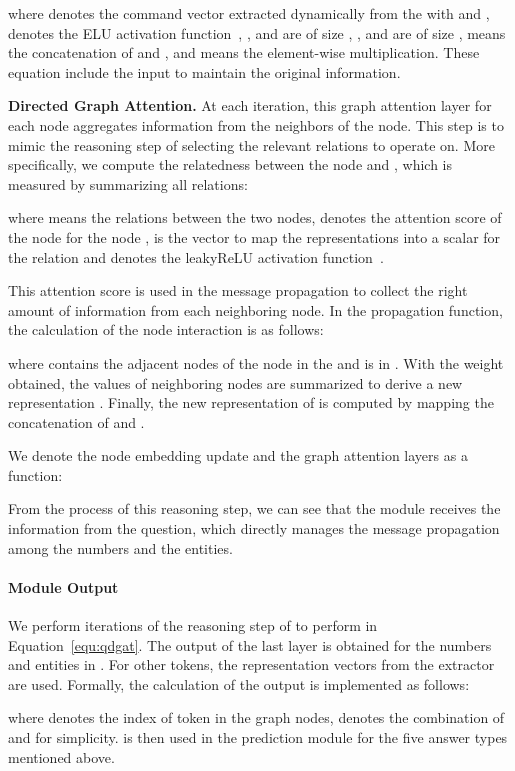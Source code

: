 \documentclass{article}
\begin{document}
where  denotes the command vector extracted dynamically from the  with  and ,  denotes the ELU activation function~\cite{DBLP:journals/corr/ClevertUH15},
,  and  are of size , ,  and  are of size ,  means the concatenation of  and , and  means the element-wise multiplication.
These equation include the input  to maintain the original information.

{\bf Directed Graph Attention.} At each iteration, this graph attention layer for each node aggregates information from the neighbors of the node. This step is to mimic the reasoning step of selecting the relevant relations to operate on. 
More specifically, we compute the relatedness between the node  and , which is measured by summarizing all relations:

where  means the relations between the two nodes,  denotes the attention score of the node  for the node ,  is the vector to map the representations into a scalar for the relation  and  denotes the leakyReLU activation function~\cite{DBLP:journals/corr/XuWCL15}. 

This attention score is used in the message propagation to collect the right amount of information from each neighboring node.
In the propagation function, the calculation of the node interaction is as follows:

where  contains the adjacent nodes of the node  in the  and  is in  .
With the weight  obtained, the values of neighboring nodes are summarized to derive a new representation .
Finally, the new representation of  is computed by mapping the concatenation of  and .


We denote the node embedding update and the graph attention layers as a function:

From the process of this reasoning step, we can see that the module receives the information from the question, which directly manages the message propagation among the numbers and the entities. 

\paragraph{Module Output}
We perform  iterations of the reasoning step of  to perform  in Equation~\ref{equ:qdgat}.
The output of the last layer  is obtained for the numbers and entities in .
For other tokens, the representation vectors from the extractor are used.
Formally, the calculation of the output  is implemented as follows:

where  denotes the index of token  in the graph nodes,  denotes the combination of  and  for simplicity.
 is then used in the prediction module for the five answer types mentioned above. 
\end{document}
